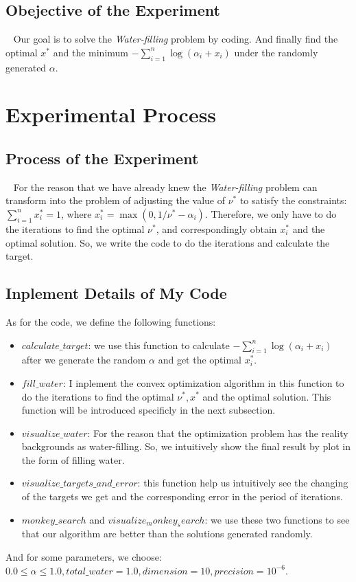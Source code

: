 \documentclass[a4paper,12pt]{article}
\begin{document}
    \subsection{Obejective of the Experiment}
    \
    \newline
    \indent Our goal is to solve the \textit{Water-filling} problem by coding. And finally find the optimal $x^*$ and the minimum $-\sum_{i=1}^{n} \log(\alpha_i+x_i)$ under the randomly generated $\alpha$.

    \section{Experimental Process}
    \subsection{Process of the Experiment}
    \
    \newline
    \indent For the reason that we have already knew the \textit{Water-filling} problem can transform into the problem of adjusting the value of $\nu^*$ to satisfy the constraints: $\sum_{i = 1}^{n} x_i^* = 1$, where $x_i^* = \max(0,1/\nu^*-\alpha_i)$.
    Therefore, we only have to do the iterations to find the optimal $\nu^*$, and correspondingly obtain $x_i^*$ and the optimal solution. So, we write the code to do the iterations and calculate the target.
    \subsection{Inplement Details of My Code}
    As for the code, we define the following functions:
    \begin{itemize}
        \item $calculate\_target$: we use this function to calculate $-\sum_{i = 1}^{n} \log (\alpha_i + x_i)$ after we generate the random $\alpha$ and get the optimal $x_i^*$.
        \item $fill\_water$: I inplement the convex optimization algorithm in this function to do the iterations to find the optimal $\nu^*,x^*$ and the optimal solution. This function will be introduced specificly in the next subsection.
        \item $visualize\_water$: For the reason that the optimization problem has the reality backgrounds as water-filling. So, we intuitively show the final result by plot in the form of filling water.
        \item $visualize\_targets\_and\_error$: this function help us intuitively see the changing of the targets we get and the corresponding error in the period of iterations.
        \item $monkey\_search$ and $visualize_monkey_search$: we use these two functions to see that our algorithm are better than the solutions generated randomly.
    \end{itemize}
    And for some parameters, we choose:\\
    $0.0 \leq \alpha \leq 1.0, total\_water = 1.0, dimension = 10, precision = 10^{-6}$.\vspace*{0.5cm} 
    
\end{document}
